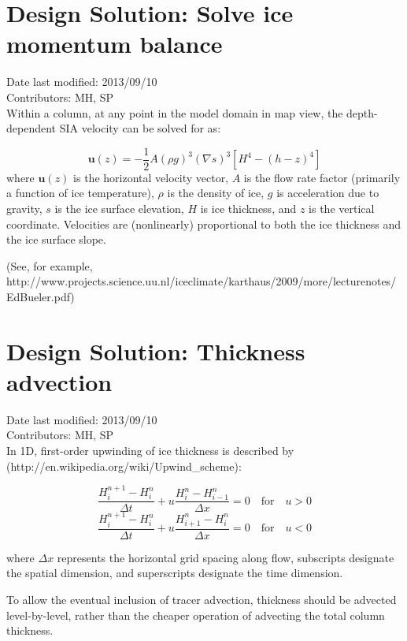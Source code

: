 \documentclass[11pt]{report}
\newcommand{\vect}[1]{\mathbf{#1}}
\begin{document}
\section{Design Solution: Solve ice momentum balance}
Date last modified: 2013/09/10 \\
Contributors: MH, SP \\

Within a column, at any point in the model domain in map view, the depth-dependent SIA velocity can be solved for as:

\begin{equation}
    \label{sia}
	\vect{u}(z) = -\frac{1}{2} A (\rho g )^3 (\nabla s)^3 \left[H^4 - (h-z)^4 \right]
\end{equation}
where $\vect{u}(z)$ is the horizontal velocity vector, $A$ is the flow rate factor (primarily a function of ice temperature), $\rho$ is the density of ice, $g$ is acceleration due to gravity, $s$ is the ice surface elevation, $H$ is ice thickness, and $z$ is the vertical coordinate. Velocities are (nonlinearly) proportional to both the ice thickness and the ice surface slope.

(See, for example, http://www.projects.science.uu.nl/iceclimate/karthaus/2009/more/lecturenotes/EdBueler.pdf)

\section{Design Solution: Thickness advection}
Date last modified: 2013/09/10 \\
Contributors: MH, SP \\

In 1D, first-order upwinding of ice thickness is described by (http://en.wikipedia.org/wiki/Upwind\_scheme):

\begin{equation}
    \label{fouw}
 \frac{H_i^{n+1} - H_i^n}{\Delta t} + u \frac{H_i^n - H_{i-1}^n}{\Delta x} = 0 \quad \text{for} \quad u > 0
\end{equation}
\begin{equation}
 \frac{H_i^{n+1} - H_i^n}{\Delta t} + u \frac{H_{i+1}^n - H_i^n}{\Delta x} = 0 \quad \text{for} \quad u < 0
\end{equation}

where ${\Delta x}$ represents the horizontal grid spacing along flow, subscripts designate the spatial dimension, and superscripts designate the time dimension.

To allow the eventual inclusion of tracer advection, thickness should be advected level-by-level, rather than the cheaper operation of advecting the total column thickness.
\end{document}
